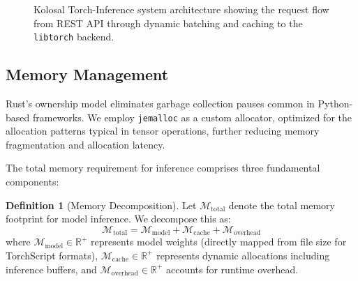 \documentclass[10pt,twocolumn,a4paper]{article}
\theoremstyle{definition}
\newtheorem{definition}{Definition}[section]
\theoremstyle{plain}
\begin{document}
\begin{figure}[t]
\centering
{}
\caption{Kolosal Torch-Inference system architecture showing the request flow from REST API through dynamic batching and caching to the \texttt{libtorch} backend.}
\label{fig:architecture}
\end{figure}

\subsection{Memory Management}

Rust's ownership model eliminates garbage collection pauses common in Python-based frameworks. We employ \texttt{jemalloc} as a custom allocator, optimized for the allocation patterns typical in tensor operations, further reducing memory fragmentation and allocation latency.

The total memory requirement for inference comprises three fundamental components:
\begin{definition}[Memory Decomposition]
\label{def:memory}
Let $\mathcal{M}_{\mathrm{total}}$ denote the total memory footprint for model inference. We decompose this as:
\begin{equation}
    \mathcal{M}_{\mathrm{total}} = \mathcal{M}_{\mathrm{model}} + \mathcal{M}_{\mathrm{cache}} + \mathcal{M}_{\mathrm{overhead}}
    \label{eq:total_memory}
\end{equation}
where $\mathcal{M}_{\mathrm{model}} \in \mathbb{R}^{+}$ represents model weights (directly mapped from file size for TorchScript formats), $\mathcal{M}_{\mathrm{cache}} \in \mathbb{R}^{+}$ represents dynamic allocations including inference buffers, and $\mathcal{M}_{\mathrm{overhead}} \in \mathbb{R}^{+}$ accounts for runtime overhead.
\end{definition}
\end{document}
